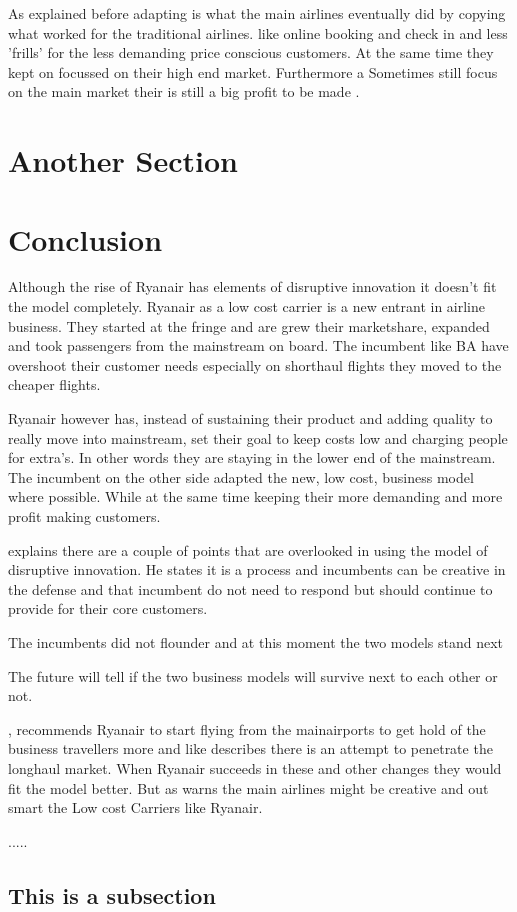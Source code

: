 \documentclass[a4paper, 11pt]{article}
\begin{document}
As explained before adapting is what the main airlines eventually did by copying what worked for the traditional airlines. like online booking and check in and less 'frills' for the less demanding price conscious customers. At the same time they kept on focussed on their high end market. Furthermore a  Sometimes still focus on the main market their is still a big profit to be made \cite{christensen2015}.



\section{Another Section}




\label{sec:this-is-a-section}

\section{Conclusion}


Although the rise of Ryanair has elements of disruptive innovation it doesn't fit the model completely. Ryanair as a low cost carrier is a new entrant in airline business. They started at the fringe and are grew their marketshare, expanded and took passengers from the mainstream on board. The incumbent like BA have overshoot their customer needs especially on shorthaul flights they moved to the cheaper flights.

Ryanair however has, instead of sustaining their product and adding quality to really move into mainstream, set their goal to keep costs low and charging people for extra's. In other words they are staying in the lower end of the mainstream. The incumbent on the other side adapted the new, low cost, business model where possible. While at the same time keeping their more demanding and more profit making customers.

\cite{christensen2015} explains there are a couple of points that are overlooked in using the model of disruptive innovation. He states it is a process and incumbents can be creative in the defense and that incumbent do not need to respond but should continue to provide for their core customers.

The incumbents did not flounder and at this moment the two models stand next

The future will tell if the two business models will survive next to each other or not.

\cite{Diaconu}, recommends Ryanair to start flying from the mainairports to get hold of the business travellers more and like \cite{Eurocontrol2018} describes there is an attempt to penetrate the longhaul market. When Ryanair succeeds in these and other changes they would fit the model better. But as \cite{christensen2015} warns the main airlines might be creative and out smart the Low cost Carriers like Ryanair.

.....








\subsection{This is a subsection}
\label{sec:this-is-a-section}

\renewcommand{\textbf}{}
\renewcommand{\bf}{}
{}
\end{document}

